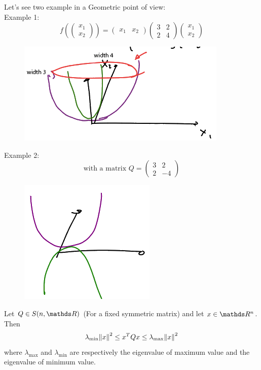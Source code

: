\documentclass[computational_mathematics.tex]{subfiles}
\begin{document}
Let's see two example in a Geometric point of view:\\
Example 1:
$$ f(\begin{pmatrix} x_1\\ x_2 \end{pmatrix}) = \begin{pmatrix} x_1 & x_2 \end{pmatrix}
\begin{pmatrix} 3 & 2 \\ 2 & 4 \end{pmatrix}\begin{pmatrix} x_1\\ x_2 \end{pmatrix}
$$
\begin{figure}[H]
    \centering
    \includegraphics[scale = 0.45]{pics/26sett/quadratic_form_1.png}
\end{figure}

Example 2: 
$$\text{with a matrix } Q = \begin{pmatrix} 3 & 2 \\ 2 & -4 \end{pmatrix}$$
\begin{figure}[H]
    \centering
    \includegraphics[scale = 0.45]{pics/26sett/quadratic_form_2.png}
\end{figure}

\newpage
\begin{proposition}
  Let $Q \in S(n, \R)$ (For a fixed symmetric matrix) and let $x \in \R^n$. Then 
  $$\lambda_{\text{min}} {\left\lVert x\right\rVert}^2 \le {x}^{T}Qx \le \lambda_{\text{max}} {\left\lVert x\right\rVert}^2$$
  where $\lambda_{\text{max}}$ and $\lambda_{\text{min}}$ are respectively the eigenvalue of maximum value and the eigenvalue of minimum value.
\end{proposition}
\end{document}
